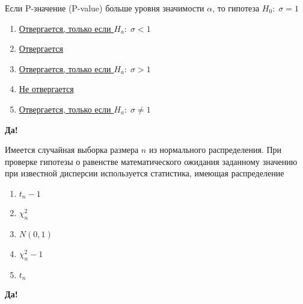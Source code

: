 \documentclass[t]{beamer}
\begin{document}
 \begin{frame} \label{40-Yes} 
\begin{block}{40} 

Если P-значение (P-value) больше уровня значимости  $\alpha$, то гипотеза  $H_0: \; \sigma=1$


 \end{block} 
\begin{enumerate} 
\item[] \hyperlink{40-No}{\beamergotobutton{} Отвергается, только если  $H_a: \; \sigma<1$}
\item[] \hyperlink{40-No}{\beamergotobutton{} Отвергается}
\item[] \hyperlink{40-No}{\beamergotobutton{} Отвергается, только если  $H_a: \; \sigma>1$}
\item[] \hyperlink{40-Yes}{\beamergotobutton{} Не отвергается}
\item[] \hyperlink{40-No}{\beamergotobutton{} Отвергается, только если  $H_a: \; \sigma\neq 1$}
\end{enumerate} 

 \textbf{Да!} 
 \hyperlink{41}{}\end{frame} 


 \begin{frame} \label{41-Yes} 
\begin{block}{41} 

Имеется случайная выборка размера $n$ из нормального распределения. При проверке гипотезы о равенстве математического ожидания заданному значению при известной дисперсии используется статистика, имеющая распределение
 


 \end{block} 
\begin{enumerate} 
\item[] \hyperlink{41-No}{\beamergotobutton{}  $t_n-1$}
\item[] \hyperlink{41-No}{\beamergotobutton{} $\chi^2_n$}
\item[] \hyperlink{41-Yes}{\beamergotobutton{} $N(0,1)$}
\item[] \hyperlink{41-No}{\beamergotobutton{} $\chi^2_n-1$}
\item[] \hyperlink{41-No}{\beamergotobutton{} $t_n$}
\end{enumerate} 

 \textbf{Да!} 
 \hyperlink{42}{}\end{frame} 
\end{document}
